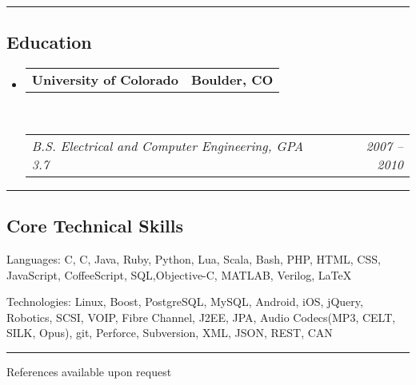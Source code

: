 \documentclass[11pt,letterpaper]{article}
\makeatletter
\newenvironment{indentsection}[1]%
{\begin{list}{}%
	{\setlength{\leftmargin}{#1}}%
	\item[]%
}
{\end{list}}
\newcommand{\headerrow}[2]
{\begin{tabular*}{\linewidth}{l@{\extracolsep{\fill}}r}
	#1 &
	#2 \\
\end{tabular*}}
\newcommand{\CPP}
{C\nolinebreak[4]\hspace{-.05em}\raisebox{.22ex}{\footnotesize\bf ++}}
\makeatother
\begin{document}
\hrule
\vspace{-0.4em}
\subsection*{Education}

\begin{itemize}
	\parskip=0.1em

	\item 
	\headerrow
		{\textbf{University of Colorado}}
		{\textbf{Boulder, CO}}
	\\
	\headerrow
		{\emph{B.S. Electrical and Computer Engineering, GPA 3.7}}
		{\emph{2007 -- 2010}}

\end{itemize}


\hrule
\vspace{-0.4em}
\subsection*{Core Technical Skills}

\begin{indentsection}{\parindent}
\begin{description*}
	\item[Languages:]
	C, \CPP, Java, Ruby, Python, Lua, Scala, Bash, PHP, HTML, CSS, JavaScript, CoffeeScript, SQL,Objective-C, MATLAB, Verilog, \LaTeX
    \vspace{0.4em}
	\item[Technologies:]
	Linux, Boost, PostgreSQL, MySQL, Android, iOS, jQuery, Robotics, SCSI, VOIP, Fibre Channel, J2EE, JPA, Audio Codecs(MP3, CELT, SILK, Opus), git, Perforce, Subversion, XML, JSON, REST, CAN
\end{description*}


\vspace{0.6em}
\hrule
\vspace{0.4em}
References available upon request
\end{indentsection}
\end{document}
